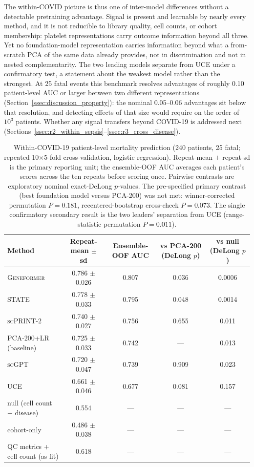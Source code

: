 \documentclass[11pt,a4paper]{article}
\newcommand{\model}[1]{\textsc{#1}}
\begin{document}
The within-COVID picture is thus one of inter-model differences without a
detectable pretraining advantage. Signal is present and learnable by nearly
every method, and it is not reducible to library quality, cell counts, or
cohort membership: platelet representations carry outcome information beyond
all three. Yet no foundation-model representation carries information beyond
what a from-scratch PCA of the same data already provides, not in
discrimination and not in nested complementarity. The two leading models
separate from \model{UCE} under a confirmatory test, a statement about the
weakest model rather than the strongest. At 25 fatal events this benchmark
resolves advantages of roughly 0.10 patient-level AUC or larger between two
different representations (Section~\ref{ssec:discussion_property}): the
nominal 0.05--0.06 advantages sit below that resolution, and detecting effects
of that size would require on the order of $10^3$ patients. Whether any signal
transfers beyond COVID-19 is addressed next
(Sections~\ref{ssec:r2_within_sepsis}--\ref{ssec:r3_cross_disease}).

\begin{table}[t]
\centering
\caption{Within-COVID-19 patient-level mortality prediction (240 patients, 25
fatal; repeated 10$\times$5-fold cross-validation, logistic regression).
Repeat-mean $\pm$ repeat-sd is the primary reporting unit; the ensemble-OOF
AUC averages each patient's scores across the ten repeats before scoring
once. Pairwise contrasts are exploratory nominal exact-DeLong $p$-values. The
pre-specified primary contrast (best foundation model versus PCA-200) was not
met: winner-corrected permutation $P = 0.181$, recentered-bootstrap
cross-check $P = 0.073$. The single confirmatory secondary result is the two
leaders' separation from \model{UCE} (range-statistic permutation
$P = 0.011$).}
\label{tab:within_covid}
\small
\begin{tabular}{lcccc}
\toprule
\textbf{Method} & \textbf{Repeat-mean $\pm$ sd} & \textbf{Ensemble-OOF AUC} & \textbf{vs PCA-200 (DeLong $p$)} & \textbf{vs null (DeLong $p$)} \\
\midrule
\model{Geneformer} & 0.786 $\pm$ 0.026 & 0.807 & 0.036 & 0.0006 \\
\model{STATE} & 0.778 $\pm$ 0.033 & 0.795 & 0.048 & 0.0014 \\
\model{scPRINT-2} & 0.740 $\pm$ 0.027 & 0.756 & 0.655 & 0.011 \\
PCA-200+LR (baseline) & 0.725 $\pm$ 0.033 & 0.742 & --- & 0.013 \\
\model{scGPT} & 0.720 $\pm$ 0.047 & 0.739 & 0.909 & 0.023 \\
\model{UCE} & 0.661 $\pm$ 0.046 & 0.677 & 0.081 & 0.157 \\
\midrule
null (cell count + disease) & 0.554 & --- & --- & --- \\
cohort-only & 0.486 $\pm$ 0.038 & --- & --- & --- \\
QC metrics + cell count (as-fit) & 0.618 & --- & --- & --- \\
\bottomrule
\end{tabular}
\end{table}
\end{document}
